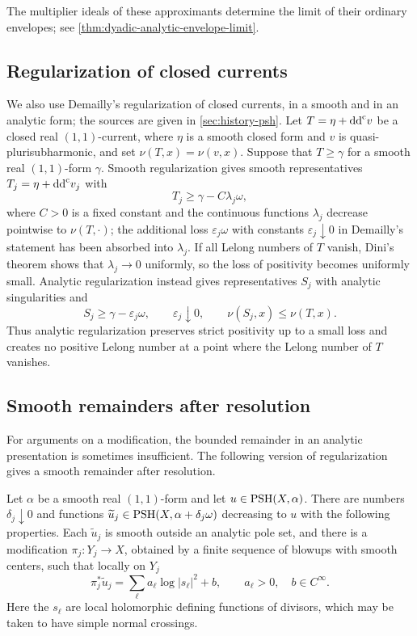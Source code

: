 The multiplier ideals of these approximants determine the limit of their ordinary envelopes; see \cref{thm:dyadic-analytic-envelope-limit}.


\subsection{Regularization of closed currents}
\label{subsec:psh-closed-regularization}

We also use Demailly's regularization of closed currents, in a smooth and in an analytic form; the sources are given in \cref{sec:history-psh}. Let $T=\eta+\mathrm{dd}^{\mathrm{c}} v$ be a closed real $(1,1)$-current, where $\eta$ is a smooth closed form and $v$ is quasi-plurisubharmonic, and set $\nu(T,x)=\nu(v,x)$. Suppose that $T\geq\gamma$ for a smooth real $(1,1)$-form $\gamma$. Smooth regularization gives smooth representatives $T_j=\eta+\mathrm{dd}^{\mathrm{c}} v_j$ with
\[
 T_j\geq\gamma-C\lambda_j\omega,
\]
where $C>0$ is a fixed constant and the continuous functions $\lambda_j$ decrease pointwise to $\nu(T,\cdot)$; the additional loss $\varepsilon_j\omega$ with constants $\varepsilon_j\downarrow0$ in Demailly's statement has been absorbed into $\lambda_j$. If all Lelong numbers of $T$ vanish, Dini's theorem shows that $\lambda_j\to0$ uniformly, so the loss of positivity becomes uniformly small. Analytic regularization \cite[Corollary~14.13]{DemAM11} instead gives representatives $S_j$ with analytic singularities and
\[
 S_j\geq\gamma-\varepsilon_j\omega,\qquad
 \varepsilon_j\downarrow0,\qquad
 \nu(S_j,x)\leq\nu(T,x).
\]
Thus analytic regularization preserves strict positivity up to a small loss and creates no positive Lelong number at a point where the Lelong number of $T$ vanishes.

\subsection{Smooth remainders after resolution}

For arguments on a modification, the bounded remainder in an analytic presentation is sometimes insufficient. The following version of regularization gives a smooth remainder after resolution.

\begin{theorem}\label{thm:resolvable-regularization-input}
Let $\alpha$ be a smooth real $(1,1)$-form and let $u\in\mathrm{PSH}(X,\alpha)$. There are numbers $\delta_j\downarrow0$ and functions $\widetilde u_j\in\mathrm{PSH}(X,\alpha+\delta_j\omega)$ decreasing to $u$ with the following properties. Each $\widetilde u_j$ is smooth outside an analytic pole set, and there is a modification $\pi_j\colon Y_j\to X$, obtained by a finite sequence of blowups with smooth centers, such that locally on $Y_j$
\[
 \pi_j^*\widetilde u_j=\sum_\ell a_\ell\log|s_\ell|^2+b,
 \qquad a_\ell>0,\quad b\in C^\infty.
\]
Here the $s_\ell$ are local holomorphic defining functions of divisors, which may be taken to have simple normal crossings.
\end{theorem}

